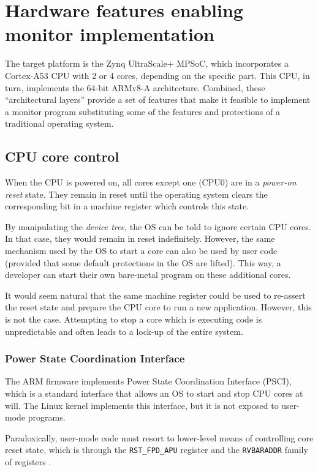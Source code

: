 \clearpage
\section{Hardware features enabling monitor implementation}

The target platform is the Zynq UltraScale+ MPSoC, which incorporates a Cortex-A53 CPU with 2 or 4 cores, depending on the specific part. This CPU, in turn, implements the 64-bit ARMv8-A architecture. Combined, these ``architectural layers'' provide a set of features that make it feasible to implement a monitor program substituting some of the features and protections of a traditional operating system.

\subsection{CPU core control}

When the CPU is powered on, all cores except one (CPU0) are in a \textit{power-on reset} state. They remain in reset until the operating system clears the corresponding bit in a machine register which controls this state.

By manipulating the \textit{device tree}, the OS can be told to ignore certain CPU cores. In that case, they would remain in reset indefinitely. However, the same mechanism used by the OS to start a core can also be used by user code (provided that some default protections in the OS are lifted). This way, a developer can start their own bare-metal program on these additional cores.

It would seem natural that the same machine register could be used to re-assert the reset state and prepare the CPU core to run a new application. However, this is not the case. Attempting to stop a core which is executing code is unpredictable and often leads to a lock-up of the entire system. \cite{zynqmp-trm}

\subsubsection{Power State Coordination Interface}

The ARM firmware implements Power State Coordination Interface (PSCI), which is a standard interface that allows an OS to start and stop CPU cores at will. The Linux kernel implements this interface, but it is not exposed to user-mode programs.

Paradoxically, user-mode code must resort to lower-level means of controlling core reset state, which is through the \texttt{RST\_FPD\_APU} register \cite{zynqmp-registers} and the \texttt{RVBARADDR} family of registers \cite{zynqmp-trm}.

